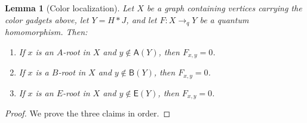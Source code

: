\documentclass[10pt,a4paper]{amsart}
\newtheorem{lemma}{Lemma}
\newcommand{\Aset}{\mathsf A}
\newcommand{\Bset}{\mathsf B}
\newcommand{\Eset}{\mathsf E}
\newcommand{\toq}{\to_q}
\begin{document}
\begin{lemma}[Color localization]\label{lem:color-localization}
Let $X$ be a graph containing vertices carrying the color gadgets above, let $Y=H*J$, and let $F:X\toq Y$ be a quantum homomorphism.  Then:
\begin{enumerate}[label=\textup{(\roman*)}]
\item If $x$ is an $A$-root in $X$ and $y\notin \Aset(Y)$, then $F_{x,y}=0$.
\item If $x$ is a $B$-root in $X$ and $y\notin \Bset(Y)$, then $F_{x,y}=0$.
\item If $x$ is an $E$-root in $X$ and $y\notin \Eset(Y)$, then $F_{x,y}=0$.
\end{enumerate}
\end{lemma}

\begin{proof}
We prove the three claims in order.


\end{proof}
\end{document}

